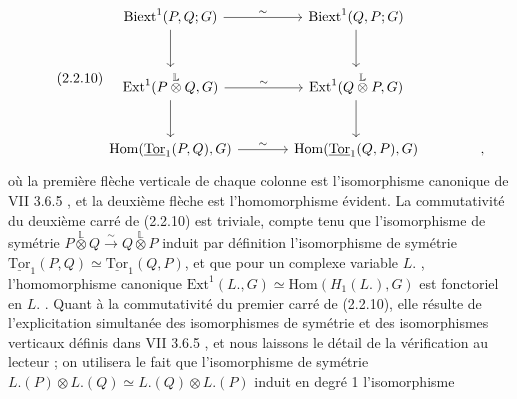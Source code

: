 \begin{equation}\tag{2.2.10}
\begin{tikzcd}[column sep=large, row sep=large]
\mathrm{Biext}^1(P,Q;G) \arrow[r, "\sim"] \arrow[d] & \mathrm{Biext}^1(Q,P;G) \arrow[d] \\
\mathrm{Ext}^1(P \overset{\mathbb{L}}{\otimes} Q,G) \arrow[r, "\sim"] \arrow[d] & \mathrm{Ext}^1(Q \overset{\mathbb{L}}{\otimes} P,G) \arrow[d] \\
\mathrm{Hom}(\underline{\mathrm{Tor}}_1(P,Q),G) \arrow[r, "\sim"] & \mathrm{Hom}(\underline{\mathrm{Tor}}_1(Q,P),G) & ,
\end{tikzcd}
\end{equation}
où la première flèche verticale de chaque colonne est l'isomorphisme canonique de VII 3.6.5 , et la deuxième flèche est l'homomorphisme évident. La commutativité du deuxième carré de (2.2.10) est triviale, compte tenu que l'isomorphisme de symétrie $P \overset{\mathbb{L}}{\otimes} Q \xrightarrow{\;\sim\;} Q \overset{\mathbb{L}}{\otimes} P$ induit par définition l'isomorphisme de symétrie $\underline{\mathrm{Tor}}_1(P,Q) \simeq \underline{\mathrm{Tor}}_1(Q,P)$, et que pour un complexe variable $L.$ , l'homomorphisme canonique $\mathrm{Ext}^1(L.,G) \simeq \mathrm{Hom}(H_1(L.),G)$ est fonctoriel en $L.$ . Quant à la commutativité du premier carré de (2.2.10), elle résulte de l'explicitation simultanée des isomorphismes de symétrie et des isomorphismes verticaux définis dans VII 3.6.5 , et nous laissons le détail de la vérification au lecteur ; on utilisera le fait que l'isomorphisme de symétrie $L.(P) \otimes L.(Q) \simeq L.(Q) \otimes L.(P)$ induit en degré 1 l'isomorphisme

